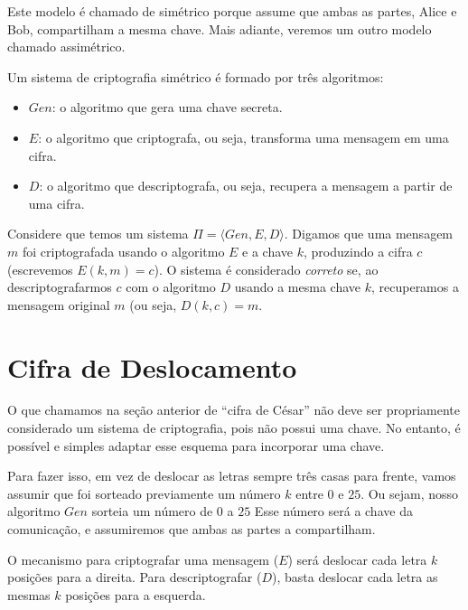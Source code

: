 Este modelo é chamado de simétrico porque assume que ambas as partes, Alice e Bob, compartilham a mesma chave.
Mais adiante, veremos um outro modelo chamado assimétrico.

Um sistema de criptografia simétrico é formado por três algoritmos:
\begin{itemize}
\item $Gen$: o algoritmo que gera uma chave secreta.
\item $E$: o algoritmo que criptografa, ou seja, transforma uma mensagem em uma cifra.
\item $D$: o algoritmo que descriptografa, ou seja, recupera a mensagem a partir de uma cifra.
\end{itemize}

Considere que temos um sistema $\Pi = \langle Gen, E, D \rangle$.
Digamos que uma mensagem $m$ foi criptografada usando o algoritmo $E$ e a chave $k$, produzindo a cifra $c$ (escrevemos $E(k,m) = c$).
O sistema é considerado {\em correto} se, ao descriptografarmos $c$ com o algoritmo $D$ usando a mesma chave $k$, recuperamos a mensagem original $m$ (ou seja, $D(k,c) = m$.

\section{Cifra de Deslocamento}
\label{sec:cifra-deslocamento}

O que chamamos na seção anterior de ``cifra de César'' não deve ser propriamente considerado um sistema de criptografia, pois não possui uma chave.
No entanto, é possível e simples adaptar esse esquema para incorporar uma chave.

Para fazer isso, em vez de deslocar as letras sempre três casas para frente, vamos assumir que foi sorteado previamente um número $k$ entre $0$ e $25$.
Ou sejam, nosso algoritmo $Gen$ sorteia um número de $0$ a $25$
Esse número será a chave da comunicação, e assumiremos que ambas as partes a compartilham.

O mecanismo para criptografar uma mensagem ($E$) será deslocar cada letra $k$ posições para a direita.
Para descriptografar ($D$), basta deslocar cada letra as mesmas $k$ posições para a esquerda.

